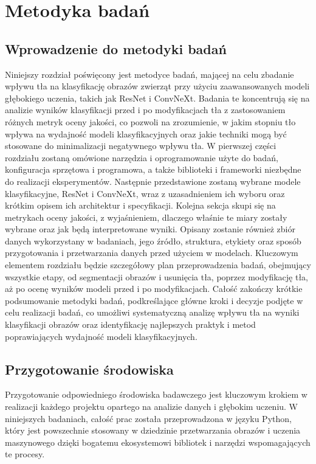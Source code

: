 \chapter*{Metodyka badań}

\section*{Wprowadzenie do metodyki badań}

Niniejszy rozdział poświęcony jest metodyce badań, mającej na celu zbadanie wpływu tła na klasyfikację obrazów zwierząt 
przy użyciu zaawansowanych modeli głębokiego uczenia, takich jak ResNet i ConvNeXt. Badania te koncentrują się na 
analizie wyników klasyfikacji przed i po modyfikacjach tła z zastosowaniem różnych metryk oceny jakości, co pozwoli na 
zrozumienie, w jakim stopniu tło wpływa na wydajność modeli klasyfikacyjnych oraz jakie techniki mogą być stosowane do 
minimalizacji negatywnego wpływu tła. W pierwszej części rozdziału zostaną omówione narzędzia i oprogramowanie użyte do 
badań, konfiguracja sprzętowa i programowa, a także biblioteki i frameworki niezbędne do realizacji eksperymentów. 
Następnie przedstawione zostaną wybrane modele klasyfikacyjne, ResNet i ConvNeXt, wraz z uzasadnieniem ich wyboru oraz 
krótkim opisem ich architektur i specyfikacji. Kolejna sekcja skupi się na metrykach oceny jakości, z wyjaśnieniem, 
dlaczego właśnie te miary zostały wybrane oraz jak będą interpretowane wyniki. Opisany zostanie również zbiór danych 
wykorzystany w badaniach, jego źródło, struktura, etykiety oraz sposób przygotowania i przetwarzania danych przed 
użyciem w modelach. Kluczowym elementem rozdziału będzie szczegółowy plan przeprowadzenia badań, obejmujący wszystkie 
etapy, od segmentacji obrazów i usunięcia tła, poprzez modyfikację tła, aż po ocenę wyników modeli przed i po 
modyfikacjach. Całość zakończy krótkie podsumowanie metodyki badań, podkreślające główne kroki i decyzje podjęte w celu 
realizacji badań, co umożliwi systematyczną analizę wpływu tła na wyniki klasyfikacji obrazów oraz identyfikację 
najlepszych praktyk i metod poprawiających wydajność modeli klasyfikacyjnych.

\section*{Przygotowanie środowiska}

Przygotowanie odpowiedniego środowiska badawczego jest kluczowym krokiem w realizacji każdego projektu opartego na 
analizie danych i głębokim uczeniu. W niniejszych badaniach, całość prac została przeprowadzona w języku Python, który 
jest powszechnie stosowany w dziedzinie przetwarzania obrazów i uczenia maszynowego dzięki bogatemu ekosystemowi 
bibliotek i narzędzi wspomagających te procesy.

